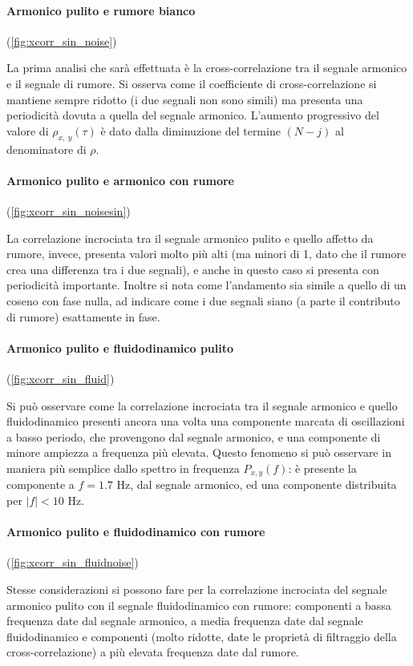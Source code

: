 \documentclass{article} %
\newcommand{\back}{$\!\!\!\!$}
\begin{document}
\paragraph{Armonico pulito e rumore bianco}\back(\cref{fig:xcorr_sin_noise})\par
La prima analisi che sarà effettuata è la cross-correlazione tra il segnale armonico e il segnale di rumore. Si osserva come il coefficiente di cross-correlazione si mantiene sempre ridotto (i due segnali non sono simili) ma presenta una periodicità dovuta a quella del segnale armonico. L'aumento progressivo del valore di $\rho_{x,\ y}(\tau)$ è dato dalla diminuzione del termine $(N - j)$ al denominatore di $\rho$.

\paragraph{Armonico pulito e armonico con rumore}\back(\cref{fig:xcorr_sin_noisesin})\par
La correlazione incrociata tra il segnale armonico pulito e quello affetto da rumore, invece, presenta valori molto più alti (ma minori di 1, dato che il rumore crea una differenza tra i due segnali), e anche in questo caso si presenta con periodicità importante. Inoltre si nota come l'andamento sia simile a quello di un coseno con fase nulla, ad indicare come i due segnali siano (a parte il contributo di rumore) esattamente in fase.

\paragraph{Armonico pulito e fluidodinamico pulito}\back(\cref{fig:xcorr_sin_fluid})\par
Si può osservare come la correlazione incrociata tra il segnale armonico e quello fluidodinamico presenti ancora una volta una componente marcata di oscillazioni a basso periodo, che provengono dal segnale armonico, e una componente di minore ampiezza a frequenza più elevata. Questo fenomeno si può osservare in maniera più semplice dallo spettro in frequenza $P_{x, y}(f)$: è presente la componente a $f = 1.7$ Hz, dal segnale armonico, ed una componente distribuita per $|f| < 10$ Hz.

\paragraph{Armonico pulito e fluidodinamico con rumore}\back(\cref{fig:xcorr_sin_fluidnoise})\par
Stesse considerazioni si possono fare per la correlazione incrociata del segnale armonico pulito con il segnale fluidodinamico con rumore: componenti a bassa frequenza date dal segnale armonico, a media frequenza date dal segnale fluidodinamico e componenti (molto ridotte, date le proprietà di filtraggio della cross-correlazione) a più elevata frequenza date dal rumore.
\end{document}
